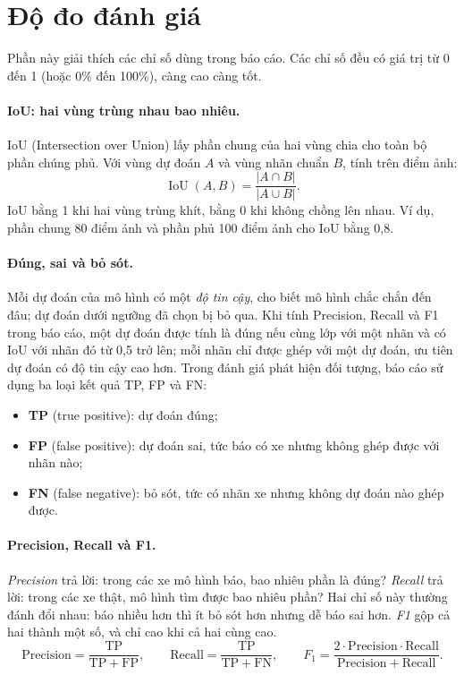 \section{Độ đo đánh giá}
\label{sec:metrics}

Phần này giải thích các chỉ số dùng trong báo cáo. Các chỉ số đều có giá trị từ 0 đến 1 (hoặc 0\% đến 100\%), càng cao càng tốt.

\paragraph{IoU: hai vùng trùng nhau bao nhiêu.} IoU (Intersection over Union) lấy phần chung của hai vùng chia cho toàn bộ phần chúng phủ.
Với vùng dự đoán $A$ và vùng nhãn chuẩn $B$, tính trên điểm ảnh:
\begin{equation}
  \operatorname{IoU}(A, B) = \frac{|A\cap B|}{|A\cup B|}.
\end{equation}
IoU bằng 1 khi hai vùng trùng khít, bằng 0 khi không chồng lên nhau. Ví dụ, phần chung 80 điểm ảnh và phần phủ 100 điểm ảnh cho IoU bằng 0,8.

\paragraph{Đúng, sai và bỏ sót.} Mỗi dự đoán của mô hình có một \emph{độ tin cậy}, cho biết mô hình chắc chắn đến đâu; dự đoán dưới ngưỡng đã chọn bị bỏ qua.
Khi tính Precision, Recall và F1 trong báo cáo, một dự đoán được tính là đúng nếu cùng lớp với một nhãn và có IoU với nhãn đó từ 0,5 trở lên; mỗi nhãn chỉ được ghép với một dự đoán, ưu tiên dự đoán có độ tin cậy cao hơn. Trong đánh giá phát hiện đối tượng, báo cáo sử dụng ba loại kết quả TP, FP và FN:
\begin{itemize}
  \item \textbf{TP} (true positive): dự đoán đúng;
  \item \textbf{FP} (false positive): dự đoán sai, tức báo có xe nhưng không ghép được với nhãn nào;
  \item \textbf{FN} (false negative): bỏ sót, tức có nhãn xe nhưng không dự đoán nào ghép được.
\end{itemize}

\paragraph{Precision, Recall và F1.} \emph{Precision} trả lời: trong các xe mô hình báo, bao nhiêu phần là đúng? \emph{Recall} trả lời: trong các xe thật, mô hình tìm được bao nhiêu phần?
Hai chỉ số này thường đánh đổi nhau: báo nhiều hơn thì ít bỏ sót hơn nhưng dễ báo sai hơn. \emph{F1} gộp cả hai thành một số, và chỉ cao khi cả hai cùng cao.
\begin{equation}
  \mathrm{Precision} = \frac{\mathrm{TP}}{\mathrm{TP}+\mathrm{FP}},\qquad
  \mathrm{Recall} = \frac{\mathrm{TP}}{\mathrm{TP}+\mathrm{FN}},\qquad
  F_1 = \frac{2\cdot\mathrm{Precision}\cdot\mathrm{Recall}}{\mathrm{Precision}+\mathrm{Recall}}.
\end{equation}

